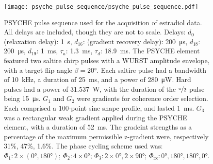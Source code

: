 \begin{figure}
    \centering
    \texttt{[image: psyche\_pulse\_sequence/psyche\_pulse\_sequence.pdf]}
    \caption[
        \acs{PSYCHE} pulse sequence used for the acquisition of estradiol data.
    ]{
        \acs{PSYCHE} pulse sequence used for the acquisition of estradiol data. All
        delays are included, though they are not to scale.
        Delays:
        $d_0$ (relaxation delay): \qty{1}{\second},
        $d_{16}$: (gradient recovery delay): \qty{200}{\micro\second},
        $d_{18}$: \qty{200}{\micro\second},
        $d_{19}$: \qty{1}{\milli\second},
        $\tau_a$: \qty{1.3}{\milli\second},
        $\tau_d$: \qty{18.9}{\milli\second}.
        The \ac{PSYCHE} element featured two saltire chirp pulses with a
        \ac{WURST}\cite{ODell2013}
        amplitude envelope, with a target flip angle $\beta = \ang{20}$.
        Each saltire pulse
        had a bandwidth of \qty{10}{\kilo\hertz},
        a duration of \qty{25}{\milli\second},
        and a power of \qty{280}{\micro\watt}.
        Hard pulses
        had a power of \qty{31.537}{\watt},
        with the duration of the $\nicefrac{\pi}{2}$ pulse being \qty{15}{\micro\second}.
        $G_1$ and $G_2$ were gradients for coherence order selection.
        Each comprised a 100-point sine shape profile, and lasted
        \qty{1}{\milli\second}.
        $G_3$ was a rectangular weak gradient applied during the PSYCHE
        element, with a duration of \qty{52}{\milli\second}.
        The gradeint strengths as a percentage of the maximum permissible
        z-gradient were, respectively 31\%, 47\%, 1.6\%.
        The phase cycling scheme used was:
        $\Phi_1: 2 \times (\ang{0}, \ang{180})$;
        $\Phi_2: 4 \times \ang{0}$;
        $\Phi_3: 2 \times \ang{0}, 2 \times \ang{90}$;
        $\Phi_{\text{rx}}: \ang{0}, \ang{180}, \ang{180}, \ang{0}$.
    }
    \label{fig:psyche}
\end{figure}


